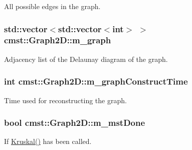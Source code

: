 All possible edges in the graph. 

\subsubsection[{\texorpdfstring{m\_graph}{m_graph}}]{\setlength{\rightskip}{0pt plus 5cm}std::vector$<$std::vector$<$int$>$ $>$ cmst::Graph2D::m\_graph\hspace{0.3cm}{\ttfamily [protected]}}\hypertarget{classcmst_1_1_graph2_d_a5df9c78edb4f5c68da11b01e44061dc5}{}\label{classcmst_1_1_graph2_d_a5df9c78edb4f5c68da11b01e44061dc5}


Adjacency list of the Delaunay diagram of the graph. 

\subsubsection[{\texorpdfstring{m\_graphConstructTime}{m_graphConstructTime}}]{\setlength{\rightskip}{0pt plus 5cm}int cmst::Graph2D::m\_graphConstructTime\hspace{0.3cm}{\ttfamily [private]}}\hypertarget{classcmst_1_1_graph2_d_ac594da90a2c9bd7332644532969ef11f}{}\label{classcmst_1_1_graph2_d_ac594da90a2c9bd7332644532969ef11f}


Time used for reconstructing the graph. 

\subsubsection[{\texorpdfstring{m\_mstDone}{m_mstDone}}]{\setlength{\rightskip}{0pt plus 5cm}bool cmst::Graph2D::m\_mstDone\hspace{0.3cm}{\ttfamily [private]}}\hypertarget{classcmst_1_1_graph2_d_ab7c087fe87b5750195100ff25f10f628}{}\label{classcmst_1_1_graph2_d_ab7c087fe87b5750195100ff25f10f628}


If \hyperlink{classcmst_1_1_graph2_d_a034d2d37b2d106c0e25d7ad7bc67907e}{Kruskal()} has been called. 

